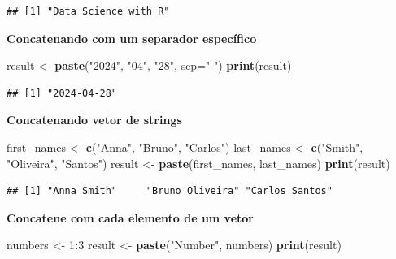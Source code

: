 \documentclass[
]{book}
\newenvironment{Shaded}{\begin{snugshade}}{\end{snugshade}}
\newcommand{\AttributeTok}[1]{\textcolor[rgb]{0.13,0.29,0.53}{#1}}
\newcommand{\DecValTok}[1]{\textcolor[rgb]{0.00,0.00,0.81}{#1}}
\newcommand{\FunctionTok}[1]{\textcolor[rgb]{0.13,0.29,0.53}{\textbf{#1}}}
\newcommand{\NormalTok}[1]{#1}
\newcommand{\OtherTok}[1]{\textcolor[rgb]{0.56,0.35,0.01}{#1}}
\newcommand{\SpecialCharTok}[1]{\textcolor[rgb]{0.81,0.36,0.00}{\textbf{#1}}}
\newcommand{\StringTok}[1]{\textcolor[rgb]{0.31,0.60,0.02}{#1}}
\theoremstyle{definition}
\theoremstyle{definition}
\theoremstyle{definition}
\theoremstyle{definition}
\theoremstyle{remark}
\begin{document}
\begin{verbatim}
## [1] "Data Science with R"
\end{verbatim}

\textbf{Concatenando com um separador específico}

\begin{Shaded}
\begin{Highlighting}[]
\NormalTok{result }\OtherTok{\textless{}{-}} \FunctionTok{paste}\NormalTok{(}\StringTok{"2024"}\NormalTok{, }\StringTok{"04"}\NormalTok{, }\StringTok{"28"}\NormalTok{, }\AttributeTok{sep=}\StringTok{"{-}"}\NormalTok{)}
\FunctionTok{print}\NormalTok{(result)}
\end{Highlighting}
\end{Shaded}

\begin{verbatim}
## [1] "2024-04-28"
\end{verbatim}

\textbf{Concatenando vetor de strings}

\begin{Shaded}
\begin{Highlighting}[]
\NormalTok{first\_names }\OtherTok{\textless{}{-}} \FunctionTok{c}\NormalTok{(}\StringTok{"Anna"}\NormalTok{, }\StringTok{"Bruno"}\NormalTok{, }\StringTok{"Carlos"}\NormalTok{)}
\NormalTok{last\_names }\OtherTok{\textless{}{-}} \FunctionTok{c}\NormalTok{(}\StringTok{"Smith"}\NormalTok{, }\StringTok{"Oliveira"}\NormalTok{, }\StringTok{"Santos"}\NormalTok{)}
\NormalTok{result }\OtherTok{\textless{}{-}} \FunctionTok{paste}\NormalTok{(first\_names, last\_names)}
\FunctionTok{print}\NormalTok{(result)}
\end{Highlighting}
\end{Shaded}

\begin{verbatim}
## [1] "Anna Smith"     "Bruno Oliveira" "Carlos Santos"
\end{verbatim}

\textbf{Concatene com cada elemento de um vetor}

\begin{Shaded}
\begin{Highlighting}[]
\NormalTok{numbers }\OtherTok{\textless{}{-}} \DecValTok{1}\SpecialCharTok{:}\DecValTok{3}
\NormalTok{result }\OtherTok{\textless{}{-}} \FunctionTok{paste}\NormalTok{(}\StringTok{"Number"}\NormalTok{, numbers)}
\FunctionTok{print}\NormalTok{(result)}
\end{Highlighting}
\end{Shaded}
\end{document}
